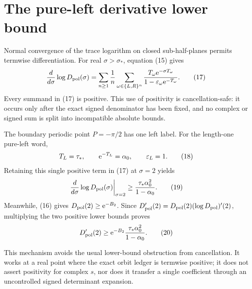 \section{The pure-left derivative lower bound}

Normal convergence of the trace logarithm on closed sub-half-planes permits
termwise differentiation.  For real \(\sigma>\sigma_*\), equation (15)
gives
\[
 \frac{d}{d\sigma}\log D_{\mathrm{pol}}(\sigma)
 =\sum_{n\ge1}\frac1n
 \sum_{\omega\in\{L,R\}^n}
 \frac{T_\omega\mathrm e^{-\sigma T_\omega}}
 {1-\varepsilon_\omega\mathrm e^{-T_\omega}}.
 \tag{17}
\]
Every summand in (17) is positive.  This use of positivity is
cancellation-safe: it occurs only after the exact signed denominator has been
fixed, and no complex or signed sum is split into incompatible absolute
bounds.

The boundary periodic point \(P=-\pi/2\) has one left label.  For the
length-one pure-left word,
\[
 T_L=\tau_*,\qquad
 \mathrm e^{-T_L}=\alpha_0,\qquad
 \varepsilon_L=1.
 \tag{18}
\]
Retaining this single positive term in (17) at \(\sigma=2\) yields
\[
 \left.\frac{d}{d\sigma}\log D_{\mathrm{pol}}(\sigma)\right|_{\sigma=2}
 \ge \frac{\tau_*\alpha_0^2}{1-\alpha_0}.
 \tag{19}
\]
Meanwhile, (16) gives \(D_{\mathrm{pol}}(2)\ge\mathrm e^{-B_2}\).  Since
\(D_{\mathrm{pol}}'(2)=D_{\mathrm{pol}}(2)(\log D_{\mathrm{pol}})'(2)\), multiplying the two positive lower
bounds proves
\[
 D_{\mathrm{pol}}'(2)\ge
 \mathrm e^{-B_2}\frac{\tau_*\alpha_0^2}{1-\alpha_0}.
 \tag{20}
\]

This mechanism avoids the usual lower-bound obstruction from cancellation.
It works at a real point where the exact orbit ledger is termwise positive;
it does not assert positivity for complex \(s\), nor does it transfer a
single coefficient through an uncontrolled signed determinant expansion.
